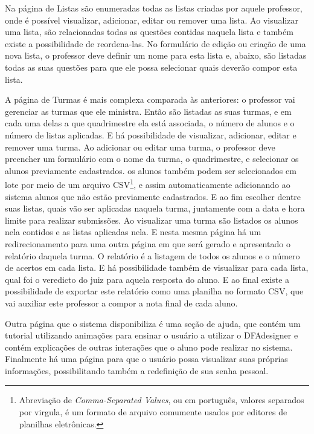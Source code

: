 \documentclass[
	12pt,				%
	openany,
	oneside,
	a4paper,			%
	english,			%
	brazil				%
	]{abntex2}
\begin{document}
  Na página de Listas são enumeradas todas as listas criadas por aquele professor, onde é possível visualizar, adicionar, editar ou remover uma lista. Ao visualizar uma lista, são relacionadas todas as questões contidas naquela lista e também existe a possibilidade de reordena-las. No formulário de edição ou criação de uma nova lista, o professor deve definir um nome para esta lista e, abaixo, são listadas todas as suas questões para que ele possa selecionar quais deverão compor esta lista.

  A página de Turmas é mais complexa comparada às anteriores: o professor vai gerenciar as turmas que ele ministra. Então são listadas as suas turmas, e em cada uma delas a que quadrimestre ela está associada, o número de alunos e o número de listas aplicadas. E há possibilidade de visualizar, adicionar, editar e remover uma turma. Ao adicionar ou editar uma turma, o professor deve preencher um formulário com o nome da turma, o quadrimestre, e selecionar os alunos previamente cadastrados. os alunos também podem ser selecionados em lote por meio de um arquivo CSV\footnote{Abreviação de \textit{Comma-Separated Values}, ou em português, valores separados por virgula, é um formato de arquivo comumente usados por editores de planilhas eletrônicas.}, e assim automaticamente adicionando ao sistema alunos que não estão previamente cadastrados. E ao fim escolher dentre suas listas, quais vão ser aplicadas naquela turma, juntamente com a data e hora limite para realizar submissões. Ao visualizar uma turma são listados os alunos nela contidos e as listas aplicadas nela. E nesta mesma página há um redirecionamento para uma outra página em que será gerado e apresentado o relatório daquela turma. O relatório é a listagem de todos os alunos e o número de acertos em cada lista. E há possibilidade também de visualizar para cada lista, qual foi o veredicto do juiz para aquela resposta do aluno. E ao final existe a possibilidade de exportar este relatório como uma planilha no formato CSV, que vai auxiliar este professor a compor a nota final de cada aluno.

  Outra página que o sistema disponibiliza é uma seção de ajuda, que contém um tutorial utilizando animações para ensinar o usuário a utilizar o DFAdesigner e contém explicações de outras interações que o aluno pode realizar no sistema. Finalmente há uma página para que o usuário possa visualizar suas próprias informações, possibilitando também a redefinição de sua senha pessoal. %
\end{document}
